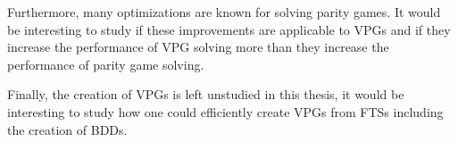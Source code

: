 Furthermore, many optimizations are known for solving parity games. It would be interesting to study if these improvements are applicable to VPGs and if they increase the performance of VPG solving more than they increase the performance of parity game solving. 

Finally, the creation of VPGs is left unstudied in this thesis, it would be interesting to study how one could efficiently create VPGs from FTSs including the creation of BDDs.